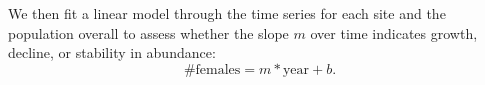 \documentclass[12pt, oneside]{article}   	%
\begin{document}
We then fit a linear model through the time series for each site and the population overall to assess whether the slope $m$ over time indicates growth, decline, or stability in abundance:
\begin{equation}
\text{\# females} = m*\text{year} + b. \label{EQN_AbundanceLM}  %
\end{equation}






\end{document}

